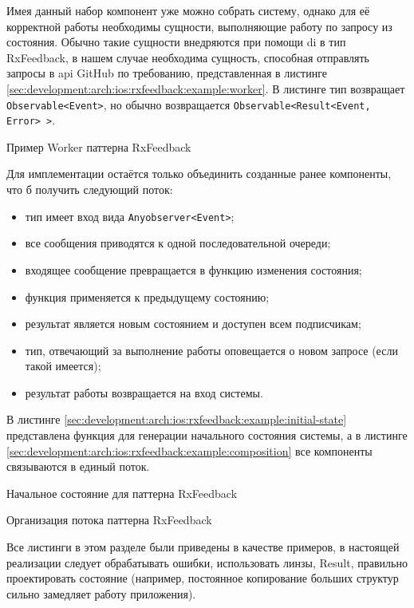 Имея данный набор компонент уже можно собрать систему, однако для её корректной работы необходимы сущности, выполняющие работу по запросу из состояния. Обычно такие сущности внедряются при помощи \gls{di} в тип RxFeedback, в нашем случае необходима сущность, способная отправлять запросы в \gls{api} GitHub по требованию, представленная в листинге \ref{sec:development:arch:ios:rxfeedback:example:worker}. В листинге тип возвращает \texttt{Observable<Event>}, но обычно возвращается \texttt{Observable<Result<Event, Error> >}.

\begin{code}
  
   \caption{Пример Worker паттерна RxFeedback}
   \label{sec:development:arch:ios:rxfeedback:example:worker}
\end{code}

Для имплементации остаётся только объединить созданные ранее компоненты, что б получить следующий поток:

\begin{itemize}
  \item тип имеет вход вида \texttt{Any\gls{observer}<Event>};
  \item все сообщения приводятся к одной последовательной очереди;
  \item входящее сообщение превращается в функцию изменения состояния;
  \item функция применяется к предыдущему состоянию;
  \item результат является новым состоянием и доступен всем подписчикам;
  \item тип, отвечающий за выполнение работы оповещается о новом запросе (если такой имеется);
  \item результат работы возвращается на вход системы.
\end{itemize}

В листинге \ref{sec:development:arch:ios:rxfeedback:example:initial-state} представлена функция для генерации начального состояния системы, а в листинге \ref{sec:development:arch:ios:rxfeedback:example:composition} все компоненты связываются в единый поток.

\begin{code}
  
   \caption{Начальное состояние для паттерна RxFeedback}
   \label{sec:development:arch:ios:rxfeedback:example:initial-state}
\end{code}

\begin{code}
  
   \caption{Организация потока паттерна RxFeedback}
   \label{sec:development:arch:ios:rxfeedback:example:composition}
\end{code}

Все листинги в этом разделе были приведены в качестве примеров, в настоящей реализации следует обрабатывать ошибки, использовать линзы, Result, правильно проектировать состояние (например, постоянное копирование больших структур сильно замедляет работу приложения).

\FloatBarrier